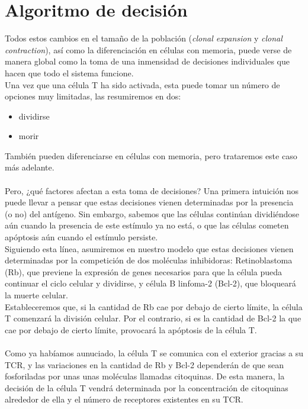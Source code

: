 \documentclass{article}
\begin{document}
	 \section{Algoritmo de decisión}
	 Todos estos cambios en el tamaño de la población (\textit{clonal expansion} y \textit{clonal contraction}), así como la diferenciación en células con memoria, puede verse de manera global como la toma de una inmensidad de decisiones individuales que hacen que todo el sistema funcione.
	 \\
	 Una vez que una célula T ha sido activada, esta puede tomar un número de opciones muy limitadas, las resumiremos en dos:
	 \begin{itemize}
	 	\item dividirse
	 	\item morir
	 \end{itemize}
     También pueden diferenciarse en células con memoria, pero trataremos este caso más adelante.
	 \\
	 \\
	 Pero, ¿qué factores afectan a esta toma de decisiones? Una primera intuición nos puede llevar a pensar que estas decisiones vienen determinadas por la presencia (o no) del antígeno. Sin embargo, sabemos que las células continúan dividiéndose aún cuando la presencia de este estímulo ya no está, o que las células cometen apóptosis aún cuando el estímulo persiste. 
	 \\
	 Siguiendo esta línea, asumiremos en nuestro modelo que estas decisiones vienen determinadas por la competición de dos moléculas inhibidoras: Retinoblastoma (Rb), que previene la expresión de genes necesarios para que la célula pueda continuar el ciclo celular y dividirse, y célula B linfoma-2 (Bcl-2), que bloqueará la muerte celular.
	 \\
	 Estableceremos que, si la cantidad de Rb cae por debajo de cierto límite, la célula T comenzará la división celular. Por el contrario, si es la cantidad de Bcl-2 la que  cae por debajo de cierto límite, provocará la apóptosis de la célula T. 
	 \\
	 \\
	 Como ya habíamos aunuciado, la célula T se comunica con el exterior gracias a su TCR, y las variaciones en la cantidad de Rb y Bcl-2 dependerán de que sean fosforiladas por unas unas moléculas llamadas citoquinas. De esta manera, la decisión de la célula T vendrá determinada por la concentración de citoquinas alrededor de ella y el número de receptores existentes en su TCR.
	\\
\end{document}

